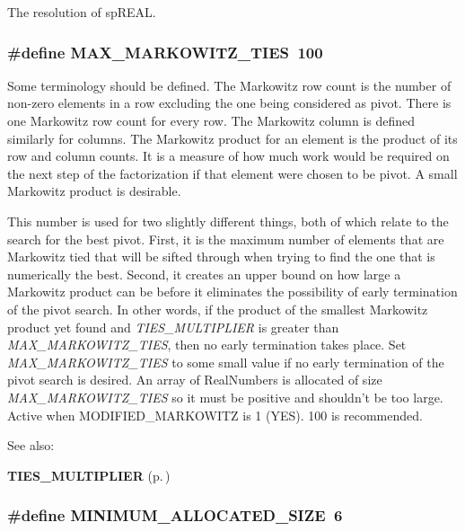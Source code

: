 The resolution of sp\-REAL. 
\subsubsection{\setlength{\rightskip}{0pt plus 5cm}\#define MAX\_\-MARKOWITZ\_\-TIES\ 100}\label{spConfig_8h_a30}


Some terminology should be defined. The Markowitz row count is the number of non-zero elements in a row excluding the one being considered as pivot. There is one Markowitz row count for every row. The Markowitz column is defined similarly for columns. The Markowitz product for an element is the product of its row and column counts. It is a measure of how much work would be required on the next step of the factorization if that element were chosen to be pivot. A small Markowitz product is desirable.

This number is used for two slightly different things, both of which relate to the search for the best pivot. First, it is the maximum number of elements that are Markowitz tied that will be sifted through when trying to find the one that is numerically the best. Second, it creates an upper bound on how large a Markowitz product can be before it eliminates the possibility of early termination of the pivot search. In other words, if the product of the smallest Markowitz product yet found and {\em TIES\_\-MULTIPLIER} is greater than {\em MAX\_\-MARKOWITZ\_\-TIES}, then no early termination takes place. Set {\em MAX\_\-MARKOWITZ\_\-TIES} to some small value if no early termination of the pivot search is desired. An array of Real\-Numbers is allocated of size {\em MAX\_\-MARKOWITZ\_\-TIES} so it must be positive and shouldn't be too large. Active when MODIFIED\_\-MARKOWITZ is 1 (YES). 100 is recommended. \begin{Desc}
\item[See also: ]\par
{\bf TIES\_\-MULTIPLIER} {\rm (p.\,\pageref{spConfig_8h_a31})} \end{Desc}
\subsubsection{\setlength{\rightskip}{0pt plus 5cm}\#define MINIMUM\_\-ALLOCATED\_\-SIZE\ 6}\label{spConfig_8h_a28}


